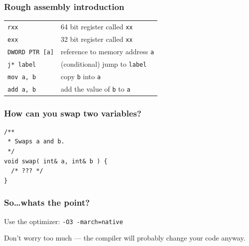 \documentclass[aspectratio=1610,14pt]{beamer}
\begin{document}
\begin{frame}
	\frametitle{Rough assembly introduction}
	\begin{center}
	{\setlength{\tabcolsep}{1.5em}\renewcommand{\arraystretch}{1.5}%
	\begin{tabular}[]{ll}
		\texttt{rxx} & 64 bit register called \texttt{xx} \\
		\texttt{exx} & 32 bit register called \texttt{xx} \\
		\texttt{DWORD PTR [a]} & reference to memory address \texttt{a} \\
		\texttt{j* label} & (conditional) jump to \texttt{label} \\
		\texttt{mov a, b} & copy \texttt{b} into \texttt{a} \\
		\texttt{add a, b} & add the value of \texttt{b} to \texttt{a} \\
	\end{tabular}}
	\end{center}
\end{frame}

\begin{frame}[fragile]
	\frametitle{How can you swap two variables?}
\newsavebox{\swapverb}%
\begin{lrbox}{\swapverb}\begin{minipage}{.6\textwidth}%
\begin{verbatim}
/**
 * Swaps a and b.
 */
void swap( int& a, int& b ) {
  /* ??? */
}
\end{verbatim}
\end{minipage}\end{lrbox}%
	\begin{center}\usebox{\swapverb}\end{center}
\end{frame}

\begin{frame}
	\frametitle{So\ldots whats the point?}
	Use the optimizer: \texttt{-O3 -march=native}

	Don't worry too much --- the compiler will probably change your code anyway.
\end{frame}
\end{document}
